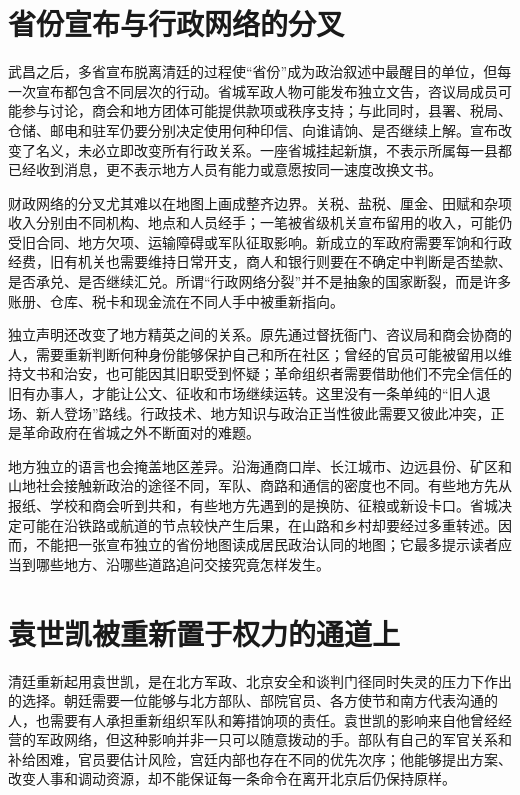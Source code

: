 \section{省份宣布与行政网络的分叉}

武昌之后，多省宣布脱离清廷的过程使“省份”成为政治叙述中最醒目的单位，但每一次宣布都包含不同层次的行动。省城军政人物可能发布独立文告，咨议局成员可能参与讨论，商会和地方团体可能提供款项或秩序支持；与此同时，县署、税局、仓储、邮电和驻军仍要分别决定使用何种印信、向谁请饷、是否继续上解。宣布改变了名义，未必立即改变所有行政关系。一座省城挂起新旗，不表示所属每一县都已经收到消息，更不表示地方人员有能力或意愿按同一速度改换文书。

财政网络的分叉尤其难以在地图上画成整齐边界。关税、盐税、厘金、田赋和杂项收入分别由不同机构、地点和人员经手；一笔被省级机关宣布留用的收入，可能仍受旧合同、地方欠项、运输障碍或军队征取影响。新成立的军政府需要军饷和行政经费，旧有机关也需要维持日常开支，商人和银行则要在不确定中判断是否垫款、是否承兑、是否继续汇兑。所谓“行政网络分裂”并不是抽象的国家断裂，而是许多账册、仓库、税卡和现金流在不同人手中被重新指向。

独立声明还改变了地方精英之间的关系。原先通过督抚衙门、咨议局和商会协商的人，需要重新判断何种身份能够保护自己和所在社区；曾经的官员可能被留用以维持文书和治安，也可能因其旧职受到怀疑；革命组织者需要借助他们不完全信任的旧有办事人，才能让公文、征收和市场继续运转。这里没有一条单纯的“旧人退场、新人登场”路线。行政技术、地方知识与政治正当性彼此需要又彼此冲突，正是革命政府在省城之外不断面对的难题。

地方独立的语言也会掩盖地区差异。沿海通商口岸、长江城市、边远县份、矿区和山地社会接触新政治的途径不同，军队、商路和通信的密度也不同。有些地方先从报纸、学校和商会听到共和，有些地方先遇到的是换防、征粮或新设卡口。省城决定可能在沿铁路或航道的节点较快产生后果，在山路和乡村却要经过多重转述。因而，不能把一张宣布独立的省份地图读成居民政治认同的地图；它最多提示读者应当到哪些地方、沿哪些道路追问交接究竟怎样发生。

\section{袁世凯被重新置于权力的通道上}

清廷重新起用袁世凯，是在北方军政、北京安全和谈判门径同时失灵的压力下作出的选择。朝廷需要一位能够与北方部队、部院官员、各方使节和南方代表沟通的人，也需要有人承担重新组织军队和筹措饷项的责任。袁世凯的影响来自他曾经经营的军政网络，但这种影响并非一只可以随意拨动的手。部队有自己的军官关系和补给困难，官员要估计风险，宫廷内部也存在不同的优先次序；他能够提出方案、改变人事和调动资源，却不能保证每一条命令在离开北京后仍保持原样。

